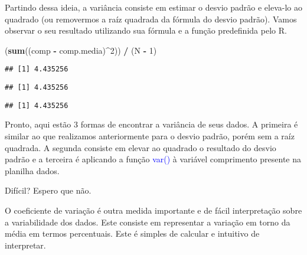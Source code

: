 \documentclass[14pt,titlepage, oneside, openany, a4paper]{book}
\newenvironment{Shaded}{\begin{snugshade}}{\end{snugshade}}
\newcommand{\DecValTok}[1]{\textcolor[rgb]{0.00,0.00,0.81}{#1}}
\newcommand{\KeywordTok}[1]{\textcolor[rgb]{0.13,0.29,0.53}{\textbf{#1}}}
\newcommand{\NormalTok}[1]{#1}
\newcommand{\OperatorTok}[1]{\textcolor[rgb]{0.81,0.36,0.00}{\textbf{#1}}}
\newcommand{\StringTok}[1]{\textcolor[rgb]{0.31,0.60,0.02}{#1}}
\begin{document}
Partindo dessa ideia, a variância consiste em estimar o desvio padrão e eleva-lo ao quadrado (ou removermos a raíz quadrada da fórmula do desvio padrão). Vamos observar o seu resultado utilizando sua fórmula e a função predefinida pelo R.

\begin{Shaded}
\begin{Highlighting}[]
\NormalTok{(}\KeywordTok{sum}\NormalTok{((comp }\OperatorTok{-}\StringTok{ }\NormalTok{comp.media)}\OperatorTok{^}\DecValTok{2}\NormalTok{)) }\OperatorTok{/}\StringTok{ }\NormalTok{(N }\OperatorTok{-}\StringTok{ }\DecValTok{1}\NormalTok{)}
\end{Highlighting}
\end{Shaded}

\begin{verbatim}
## [1] 4.435256
\end{verbatim}

\begin{Shaded}
\end{Shaded}

\begin{verbatim}
## [1] 4.435256
\end{verbatim}

\begin{Shaded}
\end{Shaded}

\begin{verbatim}
## [1] 4.435256
\end{verbatim}

Pronto, aqui estão 3 formas de encontrar a variância de seus dados. A primeira é similar ao que realizamos anteriormente para o desvio padrão, porém sem a raíz quadrada. A segunda consiste em elevar ao quadrado o resultado do desvio padrão e a terceira é aplicando a função \textcolor{blue}{var()} à variável comprimento presente na planilha dados.

Difícil? Espero que não.

O coeficiente de variação é outra medida importante e de fácil interpretação sobre a variabilidade dos dados. Este consiste em representar a variação em torno da média em termos percentuais. Este é simples de calcular e intuitivo de interpretar.
\end{document}
